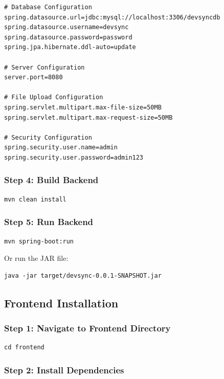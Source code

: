 \documentclass[12pt,a4paper]{article}
\begin{document}
    \begin{verbatim}
# Database Configuration
spring.datasource.url=jdbc:mysql://localhost:3306/devsyncdb
spring.datasource.username=devsync
spring.datasource.password=password
spring.jpa.hibernate.ddl-auto=update

# Server Configuration
server.port=8080

# File Upload Configuration
spring.servlet.multipart.max-file-size=50MB
spring.servlet.multipart.max-request-size=50MB

# Security Configuration
spring.security.user.name=admin
spring.security.user.password=admin123
    \end{verbatim}

    \subsubsection{Step 4: Build Backend}

    \begin{verbatim}
mvn clean install
    \end{verbatim}

    \subsubsection{Step 5: Run Backend}

    \begin{verbatim}
mvn spring-boot:run
    \end{verbatim}

    Or run the JAR file:
    \begin{verbatim}
java -jar target/devsync-0.0.1-SNAPSHOT.jar
    \end{verbatim}

    \subsection{Frontend Installation}

    \subsubsection{Step 1: Navigate to Frontend Directory}

    \begin{verbatim}
cd frontend
    \end{verbatim}

    \subsubsection{Step 2: Install Dependencies}
\end{document}
